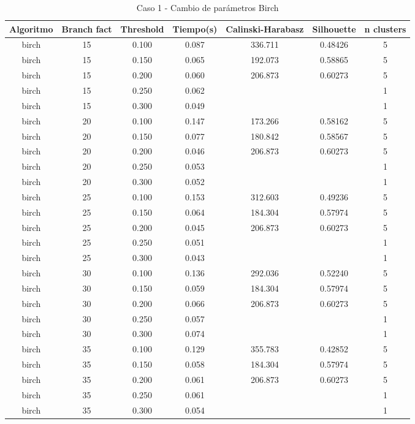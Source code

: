 \begin{table}[ht]
\centering
\caption{Caso 1 - Cambio de parámetros Birch}
\label{tab:c1_birch}
\begin{tabular}{ccccccc}
\toprule
Algoritmo & Branch fact & Threshold & Tiempo(s) & Calinski-Harabasz & Silhouette & n clusters \\
\midrule
birch & 15 & 0.100 & 0.087 & 336.711 & 0.48426 & 5 \\
birch & 15 & 0.150 & 0.065 & 192.073 & 0.58865 & 5 \\
birch & 15 & 0.200 & 0.060 & 206.873 & 0.60273 & 5 \\
birch & 15 & 0.250 & 0.062 &  &  & 1 \\
birch & 15 & 0.300 & 0.049 &  &  & 1 \\
birch & 20 & 0.100 & 0.147 & 173.266 & 0.58162 & 5 \\
birch & 20 & 0.150 & 0.077 & 180.842 & 0.58567 & 5 \\
birch & 20 & 0.200 & 0.046 & 206.873 & 0.60273 & 5 \\
birch & 20 & 0.250 & 0.053 &  &  & 1 \\
birch & 20 & 0.300 & 0.052 &  &  & 1 \\
birch & 25 & 0.100 & 0.153 & 312.603 & 0.49236 & 5 \\
birch & 25 & 0.150 & 0.064 & 184.304 & 0.57974 & 5 \\
birch & 25 & 0.200 & 0.045 & 206.873 & 0.60273 & 5 \\
birch & 25 & 0.250 & 0.051 &  &  & 1 \\
birch & 25 & 0.300 & 0.043 &  &  & 1 \\
birch & 30 & 0.100 & 0.136 & 292.036 & 0.52240 & 5 \\
birch & 30 & 0.150 & 0.059 & 184.304 & 0.57974 & 5 \\
birch & 30 & 0.200 & 0.066 & 206.873 & 0.60273 & 5 \\
birch & 30 & 0.250 & 0.057 &  &  & 1 \\
birch & 30 & 0.300 & 0.074 &  &  & 1 \\
birch & 35 & 0.100 & 0.129 & 355.783 & 0.42852 & 5 \\
birch & 35 & 0.150 & 0.058 & 184.304 & 0.57974 & 5 \\
birch & 35 & 0.200 & 0.061 & 206.873 & 0.60273 & 5 \\
birch & 35 & 0.250 & 0.061 &  &  & 1 \\
birch & 35 & 0.300 & 0.054 &  &  & 1 \\
\bottomrule
\end{tabular}
\end{table}

